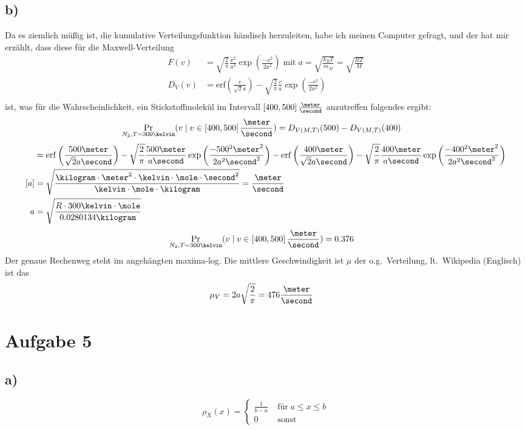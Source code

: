 \documentclass[12pt,a4paper,notitlepage]{article}
\newcommand{\aufgabe}[1]{\section*{\setcounter{section}{#1}Aufgabe #1}}
\begin{document}
\subsection*{b)}
Da es ziemlich müßig ist, die kumulative Verteilungsfunktion händisch herzuleiten, habe ich meinen Computer gefragt, und der hat mir erzählt, dass diese für die Maxwell-Verteilung
\begin{align}
F(v)&=\sqrt{\frac{2}{\pi}}\frac{x^2}{a^3}\exp\left(\frac{-x^2}{2a^2}\right)\;\text{mit}\;a=\sqrt{\frac{k_BT}{m_M}}=\sqrt{\frac{RT}{M}}\\
D_V(v)&=\mathrm{erf}\left(\frac{v}{\sqrt{2}a}\right)-\sqrt{\frac{2}{\pi}}\frac{v}{a}\exp\left(\frac{-v^2}{2a^2}\right)\\
\end{align}
ist, was für die Wahrscheinlichkeit, ein Stickstoffmolekül im Intervall $\left[400,500\right]\frac{\meter}{\second}$ anzutreffen folgendes ergibt:
\begin{align}
\Pr_{N_2,T=300\kelvin}(v\mid v\in\left[400,500\right]\frac{\meter}{\second})&=D_{V(M,T)}(500)-D_{V(M,T)}(400)
\end{align}
\begin{align}
&=\mathrm{erf}\left(\frac{500\meter}{\sqrt{2}a\second}\right)-\sqrt{\frac{2}{\pi}}\frac{500\meter}{a\second}\exp\left(\frac{-500^2\meter^2}{2a^2\second^2}\right)-\mathrm{erf}\left(\frac{400\meter}{\sqrt{2}a\second}\right)-\sqrt{\frac{2}{\pi}}\frac{400\meter}{a\second}\exp\left(\frac{-400^2\meter^2}{2a^2\second^2}\right)\\
\left[a\right]&=\sqrt{\frac{\kilogram\cdot\meter^2\cdot\kelvin\cdot\mole\cdot\second^2}{\kelvin\cdot\mole\cdot\kilogram}}=\frac{\meter}{\second}\\
a&=\sqrt{\frac{R\cdot 300\kelvin\cdot\mole}{0.0280134\kilogram}}
\end{align}
\begin{align}
\Pr_{N_2,T=300\kelvin}(v\mid v\in\left[400,500\right]\frac{\meter}{\second})&=0.376
\end{align}
Der genaue Rechenweg steht im angehängten maxima-log.
Die mittlere Geschwindigkeit ist $\mu$ der o.\;g.\ Verteilung, lt.\ Wikipedia (Englisch) ist das
\begin{align}
\mu_V&=2a\sqrt{\frac{2}{\pi}}=476\frac{\meter}{\second}
\end{align}
\aufgabe{5}
\subsection*{a)}
\begin{equation}
\rho_X(x)=\left\{\begin{matrix}\frac{1}{b-a}&\;\text{für}\;a\leq x\leq b\\0&\;\text{sonst}\end{matrix}\right.
\end{equation}
\end{document}
